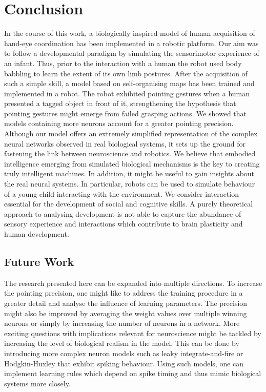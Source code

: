 \chapter{Conclusion}
\label{chap:conclusion}


In the course of this work, a biologically inspired model of human acquisition of hand-eye coordination has been implemented in a robotic platform. 
Our aim was to follow a developmental paradigm by simulating the sensorimotor experience of an infant. Thus, prior to the interaction with a human the robot used body babbling to learn the extent of its own limb postures. After the acquisition of such a simple skill, a model based on self-organising maps has been trained and implemented in a robot. The robot exhibited pointing gestures when a human presented a tagged object in front of it, strengthening the hypothesis that pointing gestures might emerge from failed grasping actions. We showed that models containing more neurons account for a greater pointing precision. 
Although our model offers an extremely simplified representation of the complex neural networks observed in real biological systems, it sets up the ground for fastening the link between neuroscience and robotics. We believe that embodied intelligence emerging from simulated biological mechanisms is the key to creating truly intelligent machines. In addition, it might be useful to gain insights about the real neural systems. In particular, robots can be used to simulate behaviour of a young child interacting with the environment. We consider interaction essential for the development of social and cognitive skills. 
A purely theoretical approach to analysing development is not able to capture the abundance of sensory experience and interactions which contribute to brain plasticity and human development.


\section{Future Work}
\label{sec:future}

The research presented here can be expanded into multiple directions. 
To increase the pointing precision, one might like to address the training procedure in a greater detail and analyse the influence of learning parameters. The precision might also be improved by averaging the weight values over multiple winning neurons or simply by increasing the number of neurons in a network. 
More exciting questions with implications relevant for neuroscience might be tackled by increasing the level of biological realism in the model. This can be done by introducing more complex neuron models such as leaky integrate-and-fire or Hodgkin-Huxley that exhibit spiking behaviour. Using such models, one can implement learning rules which depend on spike timing and thus mimic biological systems more closely.

